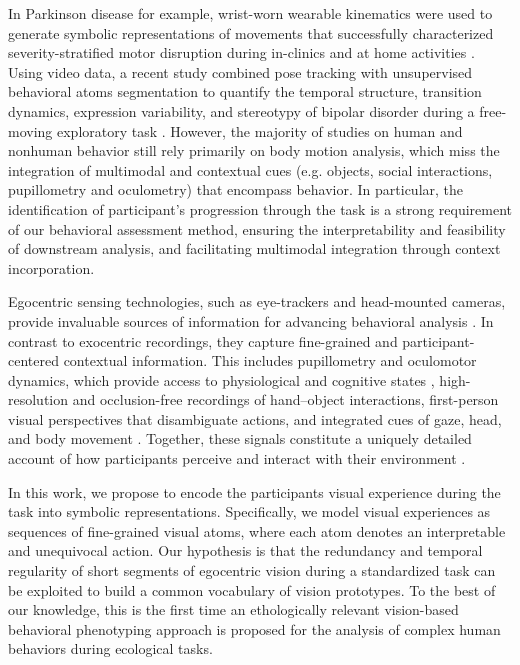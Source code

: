     In Parkinson disease for example, wrist-worn wearable kinematics were used to generate symbolic representations of movements that successfully characterized severity-stratified motor disruption during in-clinics and at home activities \cite{Abrami2020}. Using video data, a recent study combined pose tracking with unsupervised behavioral atoms segmentation to quantify the temporal structure, transition dynamics, expression variability, and stereotypy of bipolar disorder during a free-moving exploratory task \cite{Zhang2024}. However, the majority of studies on human and nonhuman behavior still rely primarily on body motion analysis, which miss the integration of multimodal and contextual cues (e.g. objects, social interactions, pupillometry and oculometry) that encompass behavior. In particular, the identification of participant's progression through the task is a strong requirement of our behavioral assessment method, ensuring the interpretability and feasibility of downstream analysis, and facilitating multimodal integration through context incorporation.%
    

    Egocentric sensing technologies, such as eye-trackers and head-mounted cameras, provide invaluable sources of information for advancing behavioral analysis \cite{RAGUSA2023103764, NUNEZMARCOS2022175}. In contrast to exocentric recordings, they capture fine-grained and participant-centered contextual information. This includes pupillometry and oculomotor dynamics, which provide access to physiological and cognitive states \cite{Castellotti2025, Strauch2022, Walter2021}, high-resolution and occlusion-free recordings of hand–object interactions, first-person visual perspectives that disambiguate actions, and integrated cues of gaze, head, and body movement \cite{NUNEZMARCOS2022175}. Together, these signals constitute a uniquely detailed account of how participants perceive and interact with their environment \cite{7298625}.

    In this work, we propose to encode the participants visual experience during the task into symbolic representations. Specifically, we model visual experiences as sequences of fine-grained visual atoms, where each atom denotes an interpretable and unequivocal action. Our hypothesis is that the redundancy and temporal regularity of short segments of egocentric vision during a standardized task can be exploited to build a common vocabulary of vision prototypes. To the best of our knowledge, this is the first time an ethologically relevant vision-based behavioral phenotyping approach is proposed for the analysis of complex human behaviors during ecological tasks.
